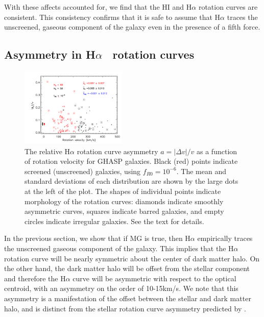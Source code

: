 \documentclass[useAMS,usenatbib,twocolumn]{mn2e}
\newcommand{\ha}{H$\alpha$}
\begin{document}
With these affects accounted for, we find that the HI and \ha{} rotation
curves are consistent.  This consistency confirms that it is safe to assume
that \ha{} traces the unscreened, gaseous component of the galaxy even
in the presence of a fifth force.


\subsection{Asymmetry in \ha~ rotation curves}\label{sec:asymmetry}


\begin{figure}
\begin{center}
\includegraphics[trim= 3cm 0cm 0cm 0cm, clip = true, width=0.45\textwidth]
{figures/GHASP2.png}
\caption{The relative \ha{} rotation curve asymmetry $a=|\Delta v|/v$ as a
function of rotation velocity for GHASP galaxies. Black (red) points
indicate screened (unscreened) galaxies, using $f_{R0}=10^{-6}$.
The mean and standard deviations of each distribution are shown by the large
dots at the left of the plot. The shapes of individual points indicate
morphology of the rotation curves: diamonds indicate smoothly asymmetric
curves, squares indicate barred galaxies, and empty circles indicate irregular
galaxies.  See the text for details.
\label{fig:plotsGHASP}}
\end{center}
\end{figure}

In the previous section, we show that if MG is true, then \ha{} empirically
traces the unscreened gaseous component of the galaxy. This implies
that the \ha{} rotation curve will be nearly symmetric about the
center of dark matter halo. On the other hand, the dark matter halo will be
offset from the stellar component and therefore the \ha{} curve will be
asymmetric with respect to the optical centroid, with an asymmetry on
the order of 10-15km/s. We note that this asymmetry is
a manifestation of the offset between the stellar and dark matter halo,
and is distinct from the stellar rotation curve asymmetry predicted by
\citet{bhuvjake2011}.
\end{document}
